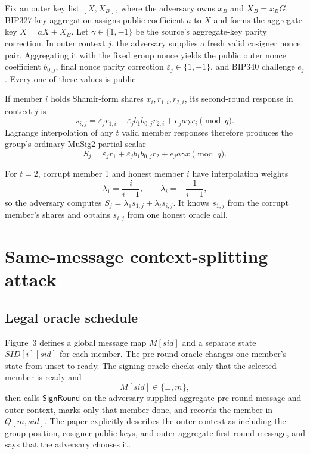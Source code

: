 \documentclass[10pt,a4paper]{article}
\newcommand{\SignRound}{\mathsf{SignRound}}
\begin{document}
Fix an outer key list $[X,X_B]$, where the adversary owns $x_B$ and
$X_B=x_BG$. BIP327 key aggregation assigns public coefficient $a$ to $X$ and
forms the aggregate key $\widetilde X=aX+X_B$. Let $\gamma\in\{1,-1\}$ be
the source's aggregate-key parity correction. In outer context $j$, the
adversary supplies a fresh valid cosigner nonce pair. Aggregating it with the
fixed group nonce yields the public outer nonce coefficient $b_{0,j}$, final
nonce parity correction $\varepsilon_j\in\{1,-1\}$, and BIP340 challenge
$e_j$. Every one of these values is public.

If member $i$ holds Shamir-form shares $x_i,r_{1,i},r_{2,i}$, its second-round
response in context $j$ is
\begin{equation}\label{eq:member}
 s_{i,j}=\varepsilon_j r_{1,i}
 +\varepsilon_j b_1b_{0,j}r_{2,i}
 +e_j a\gamma x_i \pmod q.
\end{equation}
Lagrange interpolation of any $t$ valid member responses therefore produces
the group's ordinary MuSig2 partial scalar
\begin{equation}\label{eq:group}
 S_j=\varepsilon_j r_1
 +\varepsilon_j b_1b_{0,j}r_2
 +e_j a\gamma x \pmod q.
\end{equation}

For $t=2$, corrupt member 1 and honest member $i$ have interpolation weights
\[
 \lambda_1=\frac{i}{i-1},\qquad
 \lambda_i=-\frac{1}{i-1},
\]
so the adversary computes
$S_j=\lambda_1s_{1,j}+\lambda_is_{i,j}$. It knows $s_{1,j}$ from the corrupt
member's shares and obtains $s_{i,j}$ from one honest oracle call.

\section{Same-message context-splitting attack}

\subsection{Legal oracle schedule}

Figure~3 defines a global message map $M[\mathit{sid}]$ and a separate state
$\mathit{SID}[i][\mathit{sid}]$ for each member. The pre-round oracle changes
one member's state from unset to ready. The signing oracle checks only that
the selected member is ready and
\[
 M[\mathit{sid}]\in\{\bot,m\},
\]
then calls $\SignRound$ on the adversary-supplied aggregate pre-round message
and outer context, marks only that member done, and records the member in
$Q[m,\mathit{sid}]$. The paper explicitly describes the outer context as
including the group position, cosigner public keys, and outer aggregate
first-round message, and says that the adversary chooses it.
\end{document}
